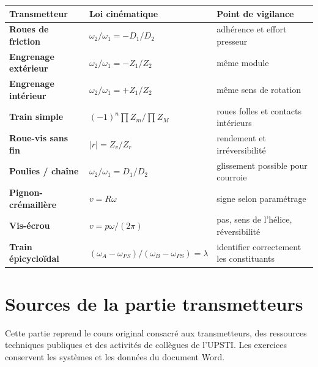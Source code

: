 \begin{center}
\small
\renewcommand{\arraystretch}{1.25}
\begin{tabularx}{\linewidth}{>{\bfseries}p{3cm}p{4.8cm}X}
\toprule
Transmetteur & Loi cinématique & Point de vigilance \\
\midrule
Roues de friction & $\omega_2/\omega_1=-D_1/D_2$ & adhérence et effort presseur \\
Engrenage extérieur & $\omega_2/\omega_1=-Z_1/Z_2$ & même module \\
Engrenage intérieur & $\omega_2/\omega_1=+Z_1/Z_2$ & même sens de rotation \\
Train simple & $(-1)^n\prod Z_m/\prod Z_M$ & roues folles et contacts intérieurs \\
Roue-vis sans fin & $|r|=Z_v/Z_r$ & rendement et irréversibilité \\
Poulies / chaîne & $\omega_2/\omega_1=D_1/D_2$ & glissement possible pour courroie \\
Pignon-crémaillère & $v=R\omega$ & signe selon paramétrage \\
Vis-écrou & $v=p\omega/(2\pi)$ & pas, sens de l'hélice, réversibilité \\
Train épicycloïdal & $(\omega_A-\omega_{PS})/(\omega_B-\omega_{PS})=\lambda$ & identifier correctement les constituants \\
\bottomrule
\end{tabularx}
\end{center}

\section{Sources de la partie transmetteurs}
\label{sec:trans-sources}

Cette partie reprend le cours original consacré aux transmetteurs, des
ressources techniques publiques et des activités de collègues de
l'UPSTI. Les exercices conservent les systèmes et les données du
document Word.
